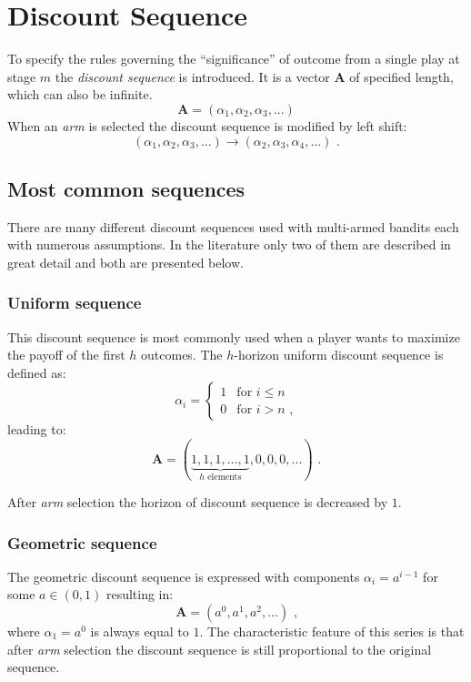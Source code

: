 \documentclass[12pt, a4paper, pdflatex, leqno]{report}
\begin{document}
\section{Discount Sequence}
To specify the rules governing the ``significance'' of outcome from a single play at stage $m$ the \emph{discount sequence} is introduced. It is a vector $\mathbf{A}$ of specified length, which can also be infinite.
$$
\mathbf{A} = \left( \alpha_1, \alpha_2, \alpha_3, ... \right)
$$
When an \emph{arm} is selected the discount sequence is modified by left shift:
$$
\left( \alpha_1, \alpha_2, \alpha_3, ... \right)
\rightarrow
\left( \alpha_2, \alpha_3, \alpha_4, ... \right) \text{ .}
$$

\subsection{Most common sequences}
There are many different discount sequences used with multi-armed bandits each with numerous assumptions. In the literature only two of them are described in great detail and both are presented below.

\subsubsection{Uniform sequence}
This discount sequence is most commonly used when a player wants to maximize the payoff of the first $h$ outcomes.
The $h$-horizon uniform discount sequence is defined as:
$$
 \alpha_i =
  \begin{cases}
   1 & \text{for } i \leq n \\
   0 & \text{for } i > n \text{ ,}
  \end{cases}
$$
leading to:
$$
  \mathbf{A} = ( \underbrace{ 1, 1, 1, ..., 1}_{h\text{ elements}}, 0, 0, 0, ... ) \text{ .}
$$

After \emph{arm} selection the horizon of discount sequence is decreased by $1$.


\subsubsection{Geometric sequence}
The geometric discount sequence is expressed with components $\alpha_i = a^{i-1}$ for some $a \in ( 0, 1 )$ resulting in:
$$
\mathbf{A} = \left( a^0, a^1, a^2, ... \right) \text{ ,}
$$
where $\alpha_1 = a^0$ is always equal to $1$. The characteristic feature of this series is that after \emph{arm} selection the discount sequence is still proportional to the original sequence.\\
\end{document}
